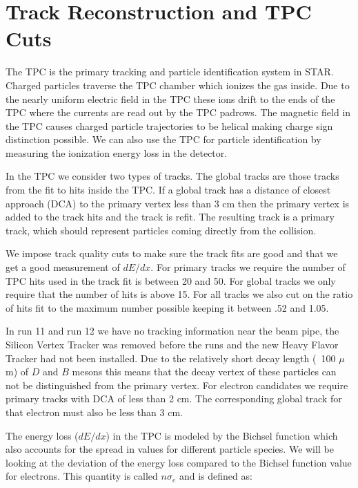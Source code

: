 \section{Track Reconstruction and TPC Cuts}

The TPC is the primary tracking and particle identification system in STAR. Charged particles traverse the TPC chamber which ionizes the gas inside. Due to the nearly uniform electric field in the TPC these ions drift to the ends of the TPC where the currents are read out by the TPC padrows. The magnetic field in the TPC causes charged particle trajectories to be helical making charge sign distinction possible. We can also use the TPC for particle identification by measuring the ionization energy loss in the detector. 

In the TPC we consider two types of tracks. The global tracks are those tracks from the fit to hits inside the TPC. If a global track has a distance of closest approach (DCA) to the primary vertex less than 3 cm then the primary vertex is added to the track hits and the track is refit. The resulting track is a primary track, which should represent particles coming directly from the collision.

We impose track quality cuts to make sure the track fits are good and that we get a good measurement of $dE/dx$. For primary tracks we require the number of TPC hits used in the track fit is between 20 and 50. For global tracks we only require that the number of hits is above 15. For all tracks we also cut on the ratio of hits fit to the maximum number possible keeping it between .52 and 1.05.

In run 11 and run 12 we have no tracking information near the beam pipe, the Silicon Vertex Tracker was removed before the runs and the new Heavy Flavor Tracker had not been installed. Due to the relatively short decay length (~100 $\mu$m) of $D$ and $B$ mesons this means that the decay vertex of these particles can not be distinguished from the primary vertex. For electron candidates we require primary tracks with DCA of less than 2 cm. The corresponding global track for that electron must also be less than 3 cm. 

The energy loss ($dE/dx$) in the TPC is modeled by the Bichsel function which also accounts for the spread in values for different particle species. We will be looking at the deviation of the energy loss compared to the Bichsel function value for electrons. This quantity is called $n\sigma_e$ and is defined as:


